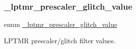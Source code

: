 \mbox{\label{group__lptmr_gad4e93a569a14f82f31f9cac1582daddd}} 
\subsubsection{\texorpdfstring{\_lptmr\_prescaler\_glitch\_value}{\_lptmr\_prescaler\_glitch\_value}}
{\footnotesize\ttfamily enum \mbox{\hyperlink{group__lptmr_gad4e93a569a14f82f31f9cac1582daddd}{\+\_\+lptmr\+\_\+prescaler\+\_\+glitch\+\_\+value}}}



L\+P\+T\+MR prescaler/glitch filter values. 

